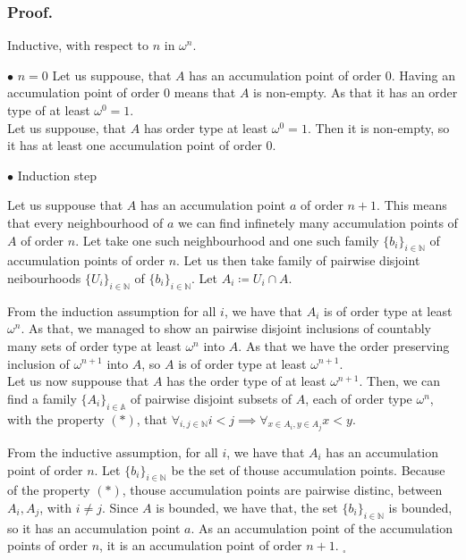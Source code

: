 \subsubsection{Proof.} 

Inductive, with respect to $n$ in $\omega^n$.

$\bullet$ $n=0$
Let us suppouse, that $A$ has an accumulation point of order $0$.
Having an accumulation point of order $0$ means that $A$ is non-empty. As that it has an order 
type of at least $\omega^0 = 1$. \\

Let us suppouse, that $A$ has order type at least $\omega^0=1$. Then it is non-empty, so it 
has at least one accumulation point of order $0$. 

$\bullet$ Induction step

Let us suppouse that $A$ has an accumulation point $a$ of order $n+1$. This means that every 
neighbourhood of $a$ we can find infinetely many accumulation points of $A$ of order $n$. 
Let take one such neighbourhood and one such family $\{b_i\}_{i \in \mathbb{N}}$ 
of accumulation points of order $n$. 
Let us then take family of pairwise disjoint neibourhoods $\{U_i\}_{i\in\mathbb{N}}$ of 
$\{b_i\}_{i \in \mathbb{N}}$. Let $A_i \coloneqq U_i\cap A$. 

From the induction assumption for all $i$, we have that $A_i$ is of order type at least 
$\omega^n$. As that, we managed to show an pairwise disjoint inclusions of countably many sets 
of order type at least $\omega^n$ into $A$. As that we have the order preserving inclusion of 
$\omega^{n+1}$ into $A$, so $A$ is of order type at least $\omega^{n+1}$. \\

Let us now suppouse that $A$ has the order type of at least $\omega^{n+1}$. Then, we can find 
a family $\{A_i\}_{i \in \mathbb{A}}$ 
of pairwise disjoint subsets of $A$, each of order type $\omega^{n}$, with the property $(\ast)$, 
that $\forall_{i,j\in\mathbb{N}}i<j \implies \forall_{x \in A_i,y\in A_j} x< y$. 

From the inductive 
assumption, for all $i$, we have that $A_i$ has an accumulation point of order $n$. Let 
$\{b_i\}_{i\in\mathbb{N}}$ be the set of thouse accumulation points.
Because of the property $(\ast)$, thouse accumulation points are pairwise distinc, between 
$A_i, A_j$, with $i\neq j$. Since $A$ is bounded, we have that, the set $\{b_i\}_{i\in\mathbb{N}}$ 
is bounded, so it has an accumulation point $a$. As an accumulation point of the accumulation 
points of order $n$, it is an accumulation point of order $n+1$. $_\square$ 

